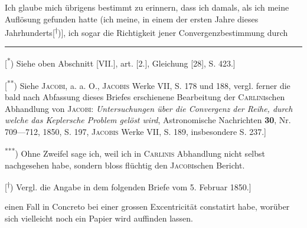 \indent Ich glaube mich übrigens bestimmt zu erinnern, dass ich damals, als ich meine Auflösung gefunden hatte (ich meine, in einem der ersten Jahre dieses Jahrhunderts[\textsuperscript{\ensuremath{\dagger}})], ich sogar die Richtigkeit jener Convergenzbestimmung durch
\par\medskip\noindent\rule{.24\linewidth}{.4pt}\par\smallskip
{\small
\noindent\hspace*{\parindent}[\textsuperscript{*}) Siehe oben Abschnitt [VII.], art. [2.], Gleichung [28], S. 423.]
\par\noindent\hspace*{\parindent}[\textsuperscript{**}) Siehe \textsc{Jacobi}, a. a. O., \textsc{Jacobis} Werke VII, S. 178 und 188, vergl. ferner die bald nach Abfassung dieses Briefes erschienene Bearbeitung der \textsc{Carlini}schen Abhandlung von \textsc{Jacobi}: \textit{Untersuchungen über die Convergenz der Reihe, durch welche das Keplersche Problem gelöst wird}, Astronomische Nachrichten \textbf{30}, Nr. 709—712, 1850, S. 197, \textsc{Jacobis} Werke VII, S. 189, insbesondere S. 237.]
\par}
\noindent\hspace*{\parindent}\textsuperscript{***}) Ohne Zweifel sage ich, weil ich in  \textsc{Carlinis} Abhandlung nicht selbst nachgesehen habe, sondern bloss flüchtig den \textsc{Jacobi}schen Bericht.
\par{\small\noindent\hspace*{\parindent}[\textsuperscript{\ensuremath{\dagger}}) Vergl. die Angabe in dem folgenden Briefe vom 5. Februar 1850.]\par}
\clearpage{}
\noindent einen Fall in Concreto bei einer grossen Excentricität constatirt habe, worüber sich vielleicht noch ein Papier wird auffinden lassen.

